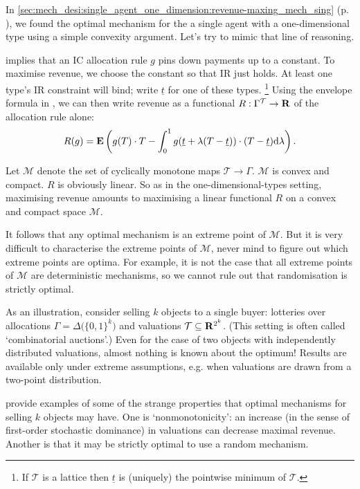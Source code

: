 \documentclass[11pt,letterpaper,reqno,oneside]{article}
\begin{document}
In \cref{sec:mech_desi:single_agent_one_dimension:revenue-maxing_mech_sing} (p. \pageref{sec:mech_desi:single_agent_one_dimension:revenue-maxing_mech_sing}), we found the optimal mechanism for the a single agent with a one-dimensional type using a simple convexity argument. Let's try to mimic that line of reasoning.

 implies that an IC allocation rule $g$ pins down payments up to a constant. To maximise revenue, we choose the constant so that IR just holds. At least one type's IR constraint will bind; write $\underline{t}$ for one of these types.%
	\footnote{If $\mathcal{T}$ is a lattice then $\underline{t}$ is (uniquely) the pointwise minimum of $\mathcal{T}$.}
Using the envelope formula in , we can then write revenue as a functional $R : \Gamma^{\mathcal{T}} \to \mathbf{R}$ of the allocation rule alone:
%
\begin{equation*}
	R(g)
	= \mathbf{E}\left(
	g(T) \cdot T
	- \int_0^1 g( \underline{t} + \lambda(T-\underline{t}) ) 
	\cdot (T-\underline{t}) \mathrm{d} \lambda 
	\right) .
\end{equation*}


Let $\mathcal{M}$ denote the set of cyclically monotone maps $\mathcal{T} \to \Gamma$. $\mathcal{M}$ is convex and compact. $R$ is obviously linear. So as in the one-dimensional-types setting, maximising revenue amounts to maximising a linear functional $R$ on a convex and compact space $\mathcal{M}$.

It follows that any optimal mechanism is an extreme point of $\mathcal{M}$. But it is very difficult to characterise the extreme points of $\mathcal{M}$, never mind to figure out which extreme points are optima. For example, it is not the case that all extreme points of $\mathcal{M}$ are deterministic mechanisms, so we cannot rule out that randomisation is strictly optimal.

As an illustration, consider selling $k$ objects to a single buyer: lotteries over allocations $\Gamma = \Delta\bigl( \{0,1\}^k \bigr)$ and valuations $\mathcal{T} \subseteq \mathbf{R}^{2^k}$. (This setting is often called `combinatorial auctions'.) Even for the case of two objects with independently distributed valuations, almost nothing is known about the optimum! Results are available only under extreme assumptions, e.g. when valuations are drawn from a two-point distribution.

\textcite{HartReny2015} provide examples of some of the strange properties that optimal mechanisms for selling $k$ objects may have. One is `nonmonotonicity': an increase (in the sense of first-order stochastic dominance) in valuations can decrease maximal revenue. Another is that it may be strictly optimal to use a random mechanism.
\end{document}
